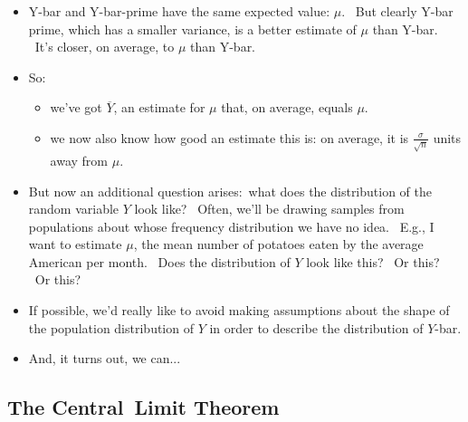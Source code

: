 \documentclass[11pt]{article}
\begin{document}
\begin{itemize}
\item Y-bar and Y-bar-prime have the same expected value: $\mu .$ \ But
clearly Y-bar prime, which has a smaller variance, is a better estimate of $%
\mu $ than Y-bar. \ It's closer, on average, to $\mu $ than Y-bar. \ 

\item So:

\begin{itemize}
\item we've got $\overline{Y}$, an estimate for $\mu $ that, on average,
equals $\mu .$

\item we now also know how good an estimate this is: on average, it is $%
\frac{\sigma }{\sqrt{n}}$ units away from $\mu .$
\end{itemize}

\item But now an additional question arises$:$ what does the distribution of
the random variable $Y$ look like? \ Often, we'll be drawing samples from
populations about whose frequency distribution we have no idea. \ E.g., I
want to estimate $\mu $, the mean number of potatoes eaten by the average
American per month. \ Does the distribution of $Y$ look like this? \ Or
this? \ Or this? \ 


\item If possible, we'd really like to avoid making assumptions about the
shape of the population distribution of $Y$ in order to describe the
distribution of $Y$-bar.

\item And, it turns out, we can...
\end{itemize}

\subsection{The Central\ Limit Theorem}
\end{document}
